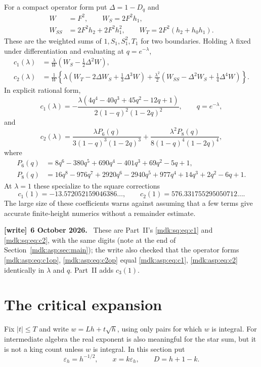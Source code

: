 \documentclass[11pt,letterpaper]{article}
\numberwithin{equation}{section}
\theoremstyle{remark}\newtheorem{remark}[theorem]{Remark}
\newenvironment{writenote}[1][]{\par\smallskip\begingroup\small
 \noindent\textbf{[write]}\if\relax\detokenize{#1}\relax\else~\textbf{#1.}\fi\ }%
 {\par\endgroup\smallskip}
\begin{document}
For a compact operator form put $\Delta=1-D_q$ and
\begin{equation}\label{mdk:asp:eq:weights}
\begin{split}
W&=F^2,\qquad W_S=2F^2h_1,\\
W_{SS}&=2F^2h_2+2F^2h_1^2,\qquad
W_T=2F^2(h_2+h_0h_1).
\end{split}
\end{equation}
These are the weighted sums of $1,S_1,S_1^2,T_1$ for two boundaries. Holding $\lambda$ fixed under differentiation and evaluating at $q=e^{-\lambda}$,
\begin{align}
c_1(\lambda)&=\frac{\lambda}{W}\left(W_S-\frac12\Delta^2W\right),\label{mdk:asp:eq:c1op}\\
c_2(\lambda)&=\frac1W\left\{\lambda\left(W_T-2\Delta W_S+\frac13\Delta^3W\right)
+\frac{\lambda^2}{2}\left(W_{SS}-\Delta^2W_S+\frac14\Delta^4W\right)\right\}.\label{mdk:asp:eq:c2op}
\end{align}
In explicit rational form,
\begin{equation}\label{mdk:asp:eq:c1}
c_1(\lambda)=-\frac{\lambda(4q^4-40q^3+45q^2-12q+1)}{2(1-q)^2(1-2q)^2},
\qquad q=e^{-\lambda},
\end{equation}
and
\begin{equation}\label{mdk:asp:eq:c2}
c_2(\lambda)=\frac{\lambda P_6(q)}{3(1-q)^3(1-2q)^3}
+\frac{\lambda^2 P_8(q)}{8(1-q)^4(1-2q)^4},
\end{equation}
where
\begin{align*}
P_6(q)&=8q^6-380q^5+690q^4-401q^3+69q^2-5q+1,\\
P_8(q)&=16q^8-976q^7+2920q^6-2940q^5+977q^4+14q^3+2q^2-6q+1.
\end{align*}
At $\lambda=1$ these specialize to the square corrections
\[
c_1(1)=-13.572052159046386\ldots,\qquad
c_2(1)=576.331755295050712\ldots.
\]
The large size of these coefficients warns against assuming that a few terms give accurate finite-height numerics without a remainder estimate.
\begin{writenote}[6 October 2026]
These are Part~II's \eqref{mdk:sq:eq:c1} and \eqref{mdk:sq:eq:c2}, with the same digits (note at the end of Section~\ref{mdk:asp:sec:main}); the write also checked that the operator forms \eqref{mdk:asp:eq:c1op}, \eqref{mdk:asp:eq:c2op} equal \eqref{mdk:asp:eq:c1}, \eqref{mdk:asp:eq:c2} identically in $\lambda$ and $q$. Part~II adds $c_3(1)$.
\end{writenote}

\section{The critical expansion}\label{mdk:asp:sec:criticalproof}
Fix $|t|\le T$ and write $w=Lh+t\sqrt h$, using only pairs for which $w$ is integral. For intermediate algebra the real exponent is also meaningful for the star sum, but it is not a king count unless $w$ is integral. In this section put
\[
\varepsilon_h=h^{-1/2},\qquad x=k\varepsilon_h,\qquad D=h+1-k.
\]
\end{document}
